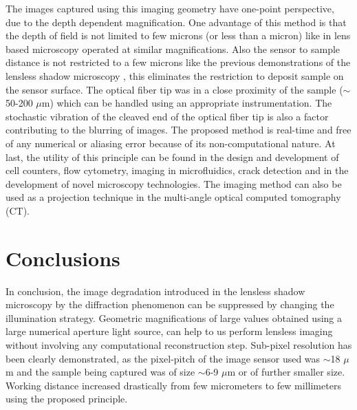 \documentclass[journal]{IEEEtran}
\begin{document}
The images captured using this imaging geometry have one-point perspective, due to the depth dependent magnification. One advantage of this method is that the depth of field is not limited to few microns (or less than a micron) like in lens based microscopy operated at similar magnifications. Also the sensor to sample distance is not restricted to a few microns like the previous demonstrations of the lensless shadow microscopy \cite{yang2018resolution}, this eliminates the restriction to deposit sample on the sensor surface. The optical fiber tip was in a close proximity of the sample ($\sim$50-200 $\mu$m) which can be handled using an appropriate instrumentation. The stochastic vibration of the cleaved end of the optical fiber tip is also a factor contributing to the blurring of images. The proposed method is real-time and free of any numerical or aliasing error because of its non-computational nature. At last, the utility of this principle can be found in the design and development of cell counters, flow cytometry, imaging in microfluidics, crack detection and in the development of novel microscopy technologies. The imaging method can also be used as a projection technique in the multi-angle optical computed tomography (CT).

\section{Conclusions}
In conclusion, the image degradation introduced in the lensless shadow microscopy by the diffraction phenomenon can be suppressed by changing the illumination strategy. Geometric magnifications of large values obtained using a large numerical aperture light source, can help to us perform lensless imaging without involving any computational reconstruction step. Sub-pixel resolution has been clearly demonstrated, as the pixel-pitch of the image sensor used was $\sim$18 $\mu$m and the sample being captured was of size $\sim$6-9 $\mu$m or of further smaller size. Working distance increased drastically from few micrometers to few millimeters using the proposed principle.
\end{document}
